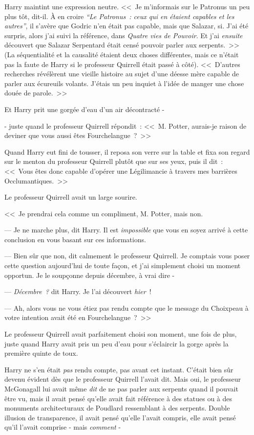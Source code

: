 Harry maintint une expression neutre. <<~Je m'informais sur le Patronus un peu plus tôt, dit-il. À en croire \emph{“Le Patronus~: ceux qui en étaient capables et les autres”}, il s'avère que Godric n'en était pas capable, mais que Salazar, si. J'ai été surpris, alors j'ai suivi la référence, dans \emph{Quatre vies de Pouvoir}. Et j'ai \emph{ensuite} découvert que Salazar Serpentard était censé pouvoir parler aux serpents.~>> (La séquentialité et la causalité étaient deux choses différentes, mais ce n'était pas la faute de Harry si le professeur Quirrell était passé à côté). <<~D'autres recherches révélèrent une vieille histoire au sujet d'une déesse mère capable de parler aux écureuils volants. J'étais un peu inquiet à l'idée de manger une chose douée de parole.~>>

Et Harry prit une gorgée d'eau d'un air décontracté -

- juste quand le professeur Quirrell répondit~: <<~M. Potter, aurais-je raison de deviner que vous aussi êtes Fourchelangue~?~>>

Quand Harry eut fini de tousser, il reposa son verre sur la table et fixa son regard sur le menton du professeur Quirrell plutôt que sur ses yeux, puis il dit~: <<~Vous êtes donc capable d'opérer une Légilimancie à travers mes barrières Occlumantiques.~>>

Le professeur Quirrell avait un large sourire.

<<~Je prendrai cela comme un compliment, M. Potter, mais non.

--- Je ne marche plus, dit Harry. Il est \emph{impossible} que vous en soyez arrivé à cette conclusion en vous basant sur ces informations.

--- Bien sûr que non, dit calmement le professeur Quirrell. Je comptais vous poser cette question aujourd'hui de toute façon, et j'ai simplement choisi un moment opportun. Je le soupçonne depuis décembre, à vrai dire -

--- \emph{Décembre~?} dit Harry. Je l'ai découvert \emph{hier}~!

--- Ah, alors vous ne vous étiez pas rendu compte que le message du Choixpeau à votre intention avait été en Fourchelangue~?~>>

Le professeur Quirrell avait parfaitement choisi son moment, une fois de plus, juste quand Harry avait pris un peu d'eau pour s'éclaircir la gorge après la première quinte de toux.

Harry ne s'en était \emph{pas} rendu compte, pas avant cet instant. C'était bien sûr devenu évident dès que le professeur Quirrell l'avait dit. Mais oui, le professeur McGonagall lui avait même \emph{dit} de ne pas parler aux serpents quand il pouvait être vu, mais il avait pensé qu'elle avait fait référence à des statues ou à des monuments architecturaux de Poudlard ressemblant à des serpents. Double illusion de transparence, il avait pensé qu'elle l'avait compris, elle avait pensé qu'il l'avait comprise - mais \emph{comment} -

